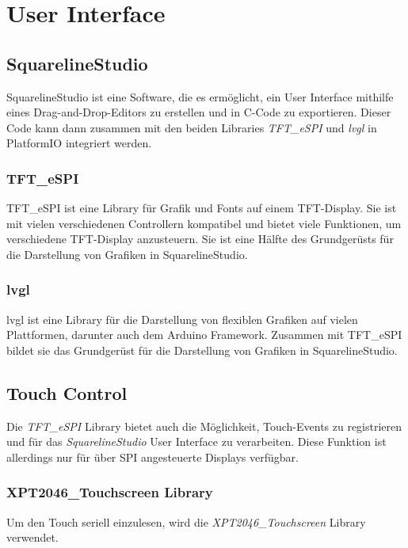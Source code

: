 \section{User Interface}
        \subsection{SquarelineStudio}
        SquarelineStudio ist eine Software, die es ermöglicht, ein 
        User Interface mithilfe eines Drag-and-Drop-Editors zu erstellen und
        in C-Code zu exportieren. Dieser Code kann dann zusammen mit den 
        beiden Libraries \textit{TFT\_eSPI} und \textit{lvgl} in PlatformIO
        integriert werden.

            \subsubsection{TFT\_eSPI}
            TFT\_eSPI ist eine Library für Grafik und Fonts auf einem TFT-Display.
            Sie ist mit vielen verschiedenen Controllern kompatibel und bietet
            viele Funktionen, um verschiedene TFT-Display anzusteuern.
            Sie ist eine Hälfte des Grundgerüsts für die Darstellung von Grafiken 
            in SquarelineStudio.

            \subsubsection{lvgl}
            lvgl ist eine Library für die Darstellung von flexiblen Grafiken
            auf vielen Plattformen, darunter auch dem Arduino Framework.
            Zusammen mit TFT\_eSPI bildet sie das Grundgerüst für die Darstellung
            von Grafiken in SquarelineStudio.
        \subsection{Touch Control} \label{sec:touch}
        Die \textit{TFT\_eSPI} Library bietet auch die Möglichkeit, Touch-Events
        zu registrieren und für das \textit{SquarelineStudio} User Interface zu
        verarbeiten. Diese Funktion ist allerdings nur für über SPI angesteuerte
        Displays verfügbar.
            \subsubsection{XPT2046\_Touchscreen Library}
            Um den Touch seriell einzulesen, wird die \textit{XPT2046\_Touchscreen}
            Library verwendet. 


